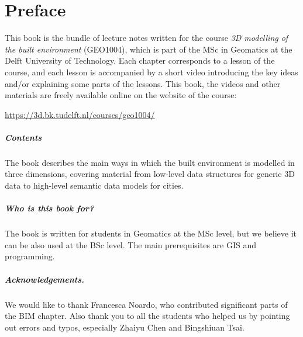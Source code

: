 


\chapter*{Preface}

This book is the bundle of lecture notes written for the course \emph{3D modelling of the built environment} (GEO1004), which is part of the MSc in Geomatics at the Delft University of Technology.
Each chapter corresponds to a lesson of the course, and each lesson is accompanied by a short video introducing the key ideas and/or explaining some parts of the lessons.
This book, the videos and other materials are freely available online on the website of the course:

\url{https://3d.bk.tudelft.nl/courses/geo1004/}

\paragraph*{Contents}
The book describes the main ways in which the built environment is modelled in three dimensions, covering material from low-level data structures for generic 3D data to high-level semantic data models for cities.

\paragraph*{Who is this book for?}
The book is written for students in Geomatics at the MSc level, but we believe it can be also used at the BSc level.
The main prerequisites are GIS and programming.

\paragraph*{Acknowledgements.}
We would like to thank Francesca Noardo, who contributed significant parts of the BIM chapter.
Also thank you to all the students who helped us by pointing out errors and typos, especially Zhaiyu Chen and Bingshiuan Tsai.




